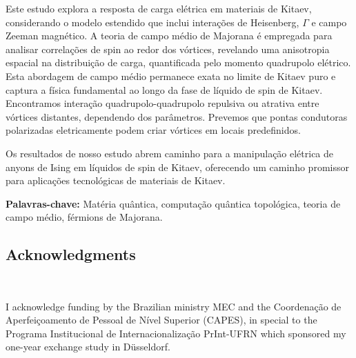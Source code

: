 Este estudo explora a resposta de carga el\'etrica em materiais de Kitaev, considerando o modelo estendido que inclui intera\c{c}\~oes de Heisenberg, $\Gamma$ e campo Zeeman magn\'etico. A teoria de campo m\'edio de Majorana \'e empregada para analisar correla\c{c}\~oes de spin ao redor dos v\'ortices, revelando uma anisotropia espacial na distribui\c{c}\~ao de carga, quantificada pelo momento quadrupolo el\'etrico. Esta abordagem de campo m\'edio permanece exata no limite de Kitaev puro e captura a f\'isica fundamental ao longo da fase  de  l\'iquido de spin de Kitaev. Encontramos  intera\c{c}\~ao quadrupolo-quadrupolo repulsiva ou atrativa  entre v\'ortices distantes, dependendo dos par\^ametros. Prevemos que pontas condutoras polarizadas eletricamente podem criar v\'ortices em locais predefinidos.

Os resultados de nosso estudo abrem caminho para a manipula\c{c}\~ao el\'etrica de anyons de Ising em l\'iquidos de spin de Kitaev, oferecendo um caminho promissor para aplica\c{c}\~oes tecnol\'ogicas de materiais de Kitaev.


\vspace{1cm}


\textbf{Palavras-chave:} Mat\'{e}ria qu\^{a}ntica, computa\c{c}\~{a}o qu\^{a}ntica topol\'{o}gica, teoria de campo m\'{e}dio, f\'{e}rmions de Majorana.


\clearpage


\begin{absolutelynopagebreak}
\chapter{Acknowledgments}


~\vfill


I acknowledge funding by the Brazilian ministry MEC and the Coordenação de Aperfeiçoamento de Pessoal de Nível Superior (CAPES), in special to the Programa Institucional de Internacionalização    PrInt-UFRN which sponsored my one-year exchange study in D\"{u}sseldorf.


\vspace{15mm}
\end{absolutelynopagebreak}







